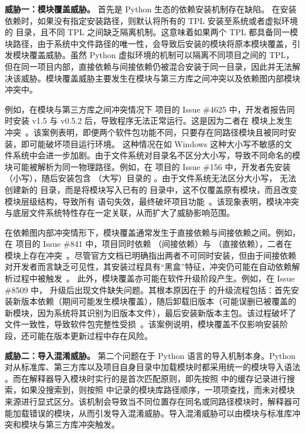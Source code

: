 \textbf{威胁一：模块覆盖威胁。}
首先是 Python 生态的依赖安装机制存在缺陷。 在安装依赖时，如果没有指定安装路径，则默认将所有的 TPL 安装至系统或者虚拟环境的  目录，且不同 TPL 之间缺乏隔离机制。这意味着如果两个 TPL 都具备同一模块路径，由于系统中文件路径的唯一性，会导致后安装的模块将原本模块覆盖，引发模块覆盖威胁。虽然 Python 虚拟环境的机制可以隔离不同项目之间的 TPL，但在同一项目内部，直接依赖与间接依赖仍被混合安装于同一目录，因此并无法解决该威胁。模块覆盖威胁主要发生在模块与第三方库之间冲突以及依赖图内部模块冲突中。

例如，在模块与第三方库之间冲突情况下  项目的 Issue \#4625 中，开发者报告同时安装  v1.5 与  v0.5.2 后，导致程序无法正常运行。这是因为二者在  模块上发生冲突~\cite{pip4625}。该案例表明，即便两个软件包功能不同，只要存在同路径模块且被同时安装，即可能破坏项目运行环境。
这种情况在如 Windows 这种大小写不敏感的文件系统中会进一步加剧。由于文件系统对目录名不区分大小写，导致不同命名的模块可能被解析为同一物理路径。例如，在  项目的 Issue \#156 中，开发者先安装 （小写），随后安装包含 （大写）目录的 。由于文件系统无法区分大小写， 无法创建新的  目录，而是将模块写入已有的  目录中，这不仅覆盖原有模块，而且改变模块层级结构，导致所有  语句失效，最终破坏项目功能~\cite{pip156}。该现象表明，模块冲突与底层文件系统特性存在一定关联，从而扩大了威胁影响范围。

在依赖图内部冲突情形下，模块覆盖通常发生于直接依赖与间接依赖之间。例如，在  项目的 Issue \#841 中，项目同时依赖 （间接依赖）与 （直接依赖），二者在  模块上存在冲突~\cite{albumentations841}。尽管官方文档已明确指出两者不可同时安装，但由于间接依赖对开发者而言缺乏可见性，其安装过程具有“黑盒”特征，冲突仍可能在自动依赖解析过程中被触发~\cite{opencv}。
此外，模块覆盖亦可能在软件升级阶段产生。例如，在 Issue \#8509 中， 升级后出现文件缺失问题。其根本原因在于  的升级流程包括：首先安装新版本依赖（期间可能发生模块覆盖），随后卸载旧版本（可能误删已被覆盖的新模块，因为系统将其识别为旧版本文件），最后安装新版本主包。该过程破坏了文件一致性，导致软件包完整性受损~\cite{pip8509}。该案例说明，模块覆盖不仅影响安装阶段，还可能在版本更新过程中存在风险。

\textbf{威胁二：导入混淆威胁。}
第二个问题在于 Python 语言的导入机制本身。Python 对从标准库、第三方库以及项目自身目录中加载模块时都采用统一的模块导入语法 。而在解释器导入模块时实行的是首次匹配原则，即先按照  中的缓存记录进行搜索，如果没搜索到，则按照  中记录的模块库路径顺序，一项项查找，而未对模块来源进行显式区分。该机制会导致当不同位置存在同名或同路径模块时，解释器可能加载错误的模块，从而引发导入混淆威胁。导入混淆威胁可以由模块与标准库冲突和模块与第三方库冲突触发。


